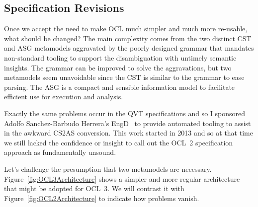 \documentclass{jot}
\begin{document}




\subsection{Specification Revisions}\label{Specification Revisions}

Once we accept the need to make OCL much simpler and much more re-usable, what should be changed? The main complexity comes from the two distinct CST and ASG metamodels aggravated by the poorly designed grammar that mandates non-standard tooling to support the disambiguation with untimely semantic insights. The grammar can be improved to solve the aggravations, but two metamodels seem unavoidable since the CST is similar to the grammar to ease parsing. The ASG is a compact and sensible information model to facilitate efficient use for execution and analysis.

Exactly the same problems occur in the QVT specifications and so I sponsored Adolfo Sanchez-Barbudo Herrera's EngD~\cite{Sanchez} to provide automated tooling to assist in the awkward CS2AS conversion. This work started in 2013 and so at that time we still lacked the confidence or insight to call out the OCL~2 specification approach as fundamentally unsound.

Let's challenge the presumption that two metamodels are necessary. Figure~\ref{fig:OCL3Architecture} shows a simpler and more regular architecture that might be adopted for OCL~3. We will contrast it with Figure~\ref{fig:OCL2Architecture} to indicate how problems vanish.
\end{document}
